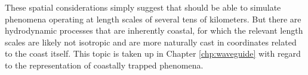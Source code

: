 These spatial considerations simply suggest that \BL{} should be able to simulate phenomena operating at length scales of several tens of kilometers.
But there are hydrodynamic processes that are inherently coastal, for which the relevant length scales are likely not isotropic and are more naturally cast in coordinates related to the coast itself.    
This topic is taken up in Chapter \ref{chp:waveguide} with regard to the representation of coastally trapped phenomena.




